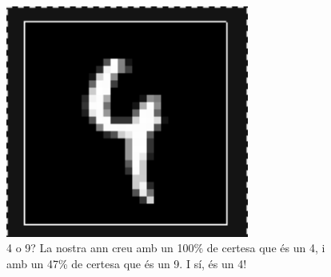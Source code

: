 \begin{figure}[ht!]
\centering
\includegraphics[width=80mm]{data/confusing.png}
\caption{4 o 9? La nostra \ac{ann} creu amb un 100\% de certesa que és un 4, i amb un 47\% de certesa que és un 9. I sí, és un 4!}
\label{simple_ann}
\end{figure}